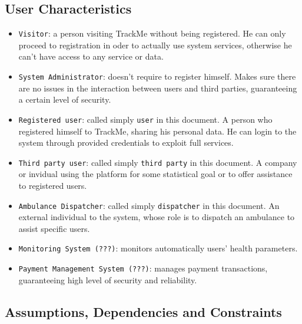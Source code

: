 \documentclass[12pt,a4paper]{article}
\begin{document}
		\subsection{User Characteristics}
			\begin{itemize}
				\item \texttt{Visitor}: a person visiting TrackMe without being registered. He can only proceed to registration in oder to actually use system services, otherwise he can't have access to any service or data.
				\item \texttt{System Administrator}: doesn't require to register himself. Makes sure there are no issues in the interaction between users and third parties, guaranteeing a certain level of security.
				\item \texttt{Registered user}: called simply \texttt{user} in this document. A person who registered himself to TrackMe, sharing his personal data. He can login to the system through provided credentials to exploit full services.
				\item \texttt{Third party user}: called simply \texttt{third party} in this document. A company or invidual using the platform for some statistical goal or to offer assistance to registered users.
				\item \texttt{Ambulance Dispatcher}: called simply \texttt{dispatcher} in this document. An external individual to the system, whose role is to dispatch an ambulance to assist specific users.
				\item \texttt{Monitoring System (???)}: monitors automatically users' health parameters.
				\item \texttt{Payment Management System (???)}: manages payment transactions, guaranteeing high level of security and reliability.
			\end{itemize}
		
		\subsection{Assumptions, Dependencies and Constraints}
\end{document}
